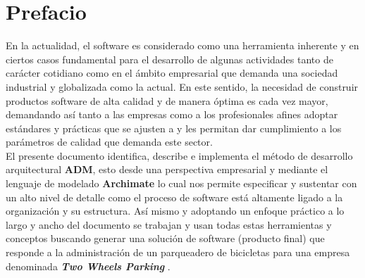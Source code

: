 \chapter{Prefacio}

En la actualidad, el software es considerado como una herramienta inherente y en ciertos casos fundamental para el desarrollo de algunas actividades tanto de carácter cotidiano como en el ámbito empresarial que demanda una sociedad industrial y globalizada como la actual. En este sentido, la necesidad de construir productos software de alta calidad y de manera óptima es cada vez mayor, demandando así tanto a las empresas como a los profesionales afines adoptar estándares y prácticas que se ajusten a  y les permitan dar cumplimiento a los parámetros de calidad que demanda este sector.\\

El presente documento identifica, describe e implementa el método de desarrollo arquitectural \textbf{ADM}, esto desde una perspectiva empresarial y mediante el lenguaje de modelado \textbf{Archimate} lo cual nos  permite especificar y sustentar con un alto nivel de detalle como el proceso de software está altamente ligado a la organización y su estructura. Así mismo y adoptando un enfoque práctico a lo largo y ancho del documento se trabajan y usan todas estas herramientas y conceptos buscando generar una solución de software (producto final) que responde a la administración de un parqueadero de bicicletas para una empresa denominada \textit{\textbf{Two Wheels Parking}} .

